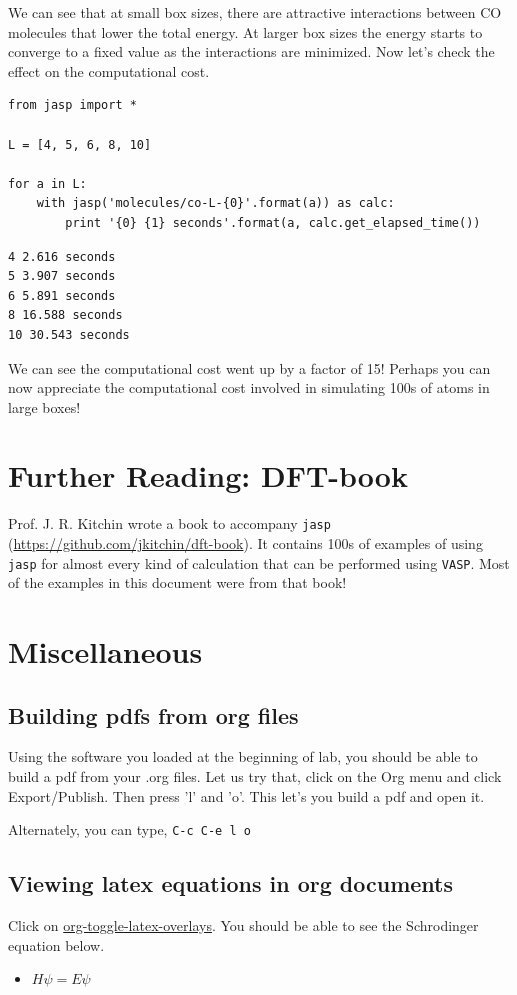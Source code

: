 \documentclass[11pt]{article}
\begin{document}
We can see that at small box sizes, there are attractive interactions between CO molecules that lower the total energy. At larger box sizes the energy starts to converge to a fixed value as the interactions are minimized. Now let's check the effect on the computational cost.

\begin{verbatim}
from jasp import *

L = [4, 5, 6, 8, 10]

for a in L:
    with jasp('molecules/co-L-{0}'.format(a)) as calc:
        print '{0} {1} seconds'.format(a, calc.get_elapsed_time())
\end{verbatim}

\begin{verbatim}
4 2.616 seconds
5 3.907 seconds
6 5.891 seconds
8 16.588 seconds
10 30.543 seconds
\end{verbatim}

We can see the computational cost went up by a factor of 15! Perhaps you can now appreciate the computational cost involved in simulating 100s of atoms in large boxes!



\section{Further Reading: DFT-book}
\label{sec-8}

Prof. J. R. Kitchin wrote a book to accompany \texttt{jasp} (\url{https://github.com/jkitchin/dft-book}). It contains 100s of examples of using \texttt{jasp} for almost every kind of calculation that can be performed using \texttt{VASP}. Most of the examples in this document were from that book!



\section{Miscellaneous}
\label{sec-9}

\subsection{Building pdfs from org files}
\label{sec-9-1}

Using the software you loaded at the beginning of lab, you should be able to build a pdf from your .org files. Let us try that, click on the Org menu and click Export/Publish. Then press 'l' and 'o'. This let's you build a pdf and open it.

Alternately, you can type, \verb~C-c C-e l o~


\subsection{Viewing latex equations in org documents}
\label{sec-9-2}

Click on \url{org-toggle-latex-overlays}. You should be able to see the Schrodinger equation below.

\begin{itemize}
\item $H\psi = E\psi$
\end{itemize}
\end{document}
